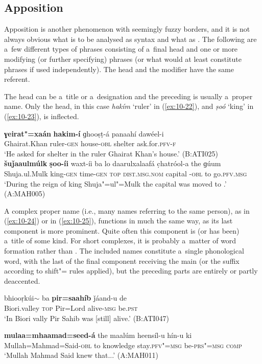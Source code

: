 \subsection{Apposition}
\label{subsec:10-1-3}

Apposition is another phenomenon with seemingly fuzzy borders, and it is not always obvious what is to be analysed as   syntax and what as  . The following are a~few different types of  phrases consisting of a~final  head and one or more modifying (or further specifying)  phrases (or what would at least constitute  phrases if used independently). The head and the modifier have the same referent.


The head can be a~title or a~designation and the preceding  is usually a~proper name. Only the head, in this case \textit{hakím} `ruler' in (\ref{ex:10-22}), and \textit{ṣoó} `king' in (\ref{ex:10-23}), is inflected.

\ea
\label{ex:10-22}
\gll \textbf{ɣeirat"=xaán} \textbf{hakim-í} ɡhooṣṭ-á panaahí dawéel-i \\
Ghairat.Khan ruler-\textsc{gen} house-\textsc{obl} shelter ask.for.\textsc{pfv-f} \\
\glt `He asked for shelter in the ruler Ghairat Khan's house.' (B:ATI025)
\ex
\label{ex:10-23}
\gll \textbf{šuǰaaulmúlk} \textbf{ṣoo-íi} waxt-íi ba lo daarulxalaafá c̣hatróol-a the ɡúum \\
Shuja.ul.Mulk king-\textsc{gen} time-\textsc{gen} \textsc{top} \textsc{dist.msg.nom}  capital \iliChitral-\textsc{obl} to go.\textsc{pfv.msg}  \\
\glt `During the reign of king Shuja"=ul"=Mulk the capital was moved to \iliChitral.' (A:MAH005)
\z

A complex proper name (i.e., many names referring to the same person), as in (\ref{ex:10-24}) or in (\ref{ex:10-25}), functions in much the same way, as its last component is more prominent. Quite often this component is (or has been) a~title of some kind. For short complexes, it is probably a~matter of word formation rather than . The included names constitute a~single phonological word, with the last  of the final component receiving the main  (or the suffix according to shift"= rules applied), but the preceding parts are entirely or partly deaccented.

\begin{exe}
\ex
\label{ex:10-24}
\gll bhiooṛkúi$\sim$ ba \textbf{pir=saahíb} ǰáand-u de\\
Biori.valley \textsc{top} Pir=Lord alive-\textsc{msg} be.\textsc{pst}\\
\glt `In Biori vally Pir Sahib was [still] alive.' (B:ATI047)

\ex
\label{ex:10-25}
\gll \textbf{mulaa=mhaamad=seed-á} the maalúm heensíl-u hín-u ki\\
Mullah=Mahmad=Said-\textsc{obl} to knowledge stay.\textsc{pfv"=msg} be-\textsc{prs"=msg} \textsc{comp}\\
\glt `Mullah Mahmad Said knew that...' (A:MAH011)
\end{exe}

